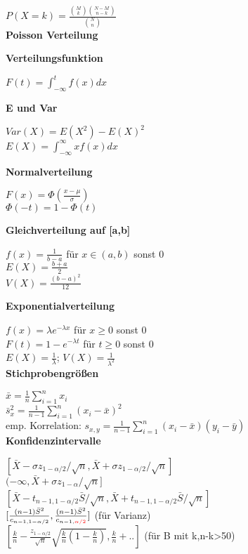 \documentclass[10pt,twocolumn,a4paper]{article}
\begin{document}
\begin{flushleft}
$P(X=k) = \frac{\binom{M}{k}\binom{N-M}{n-k}}{\binom{N}{n}}$\\

\textbf{Poisson Verteilung}

\textbf{Verteilungsfunktion}

$F(t) = \int_{-\infty}^t f(x) dx$

\textbf{E und Var}

$Var(X) = E(X^2) - E(X)^2$\\
$E(X) = \int_{-\infty}^{\infty} xf(x) dx$

\textbf{Normalverteilung}

$F(x) = \Phi(\frac{x-\mu}{\sigma})$\\
$\Phi(-t) = 1-\Phi(t)$

\textbf{Gleichverteilung auf [a,b]}

$f(x) = \frac{1}{b-a}$ für $x \in (a,b)$ sonst 0\\
$E(X) = \frac{b+a}{2}$\\
$V(X) = \frac{(b-a)^2}{12}$

\textbf{Exponentialverteilung}

$f(x) = \lambda e^{-\lambda x}$ für $x \geq 0$ sonst 0\\
$F(t) = 1-e^{-\lambda t}$ für $t \geq 0$ sonst 0\\
$E(X) = \frac{1}{\lambda}$; $V(X) = \frac{1}{\lambda^2}$\\

\textbf{Stichprobengrößen}

$\bar{x} = \frac{1}{n} \sum_{i=1}^{n}x_i$\\
$\bar{s}_x^2 = \frac{1}{n-1} \sum_{i=1}^{n}(x_i-\bar{x})^2$\\
emp. Korrelation: $s_{x,y} = \frac{1}{n-1} \sum_{i=1}^{n}(x_i-\bar{x})(y_i-\bar{y})$\\

\textbf{Konfidenzintervalle}

$[\bar{X}-\sigma z_{1-\alpha/2}/\sqrt{n}, \bar{X}+\sigma z_{1-\alpha/2}/\sqrt{n}]$\\
$(-\infty, \bar{X}+\sigma z_{1-\alpha}/\sqrt{n}]$\\
$[\bar{X} - t_{n-1,1-\alpha/2}\bar{S}/\sqrt{n}, \bar{X} + t_{n-1,1-\alpha/2}\bar{S}/\sqrt{n}]$\\
$[\frac{(n-1)\bar{S}^2}{c_{n-1,1-\alpha/2}},\frac{(n-1)\bar{S}^2}{c_{n-1,\textcolor{red}{\alpha/2}}}]$ (für Varianz)\\
$[\frac{k}{n}-\frac{z_{1-\alpha/2}}{\sqrt{n}}\sqrt{\frac{k}{n}(1-\frac{k}{n})}, \frac{k}{n}+..]$ (für B mit k,n-k>50)\\


\end{flushleft}
\end{document}
